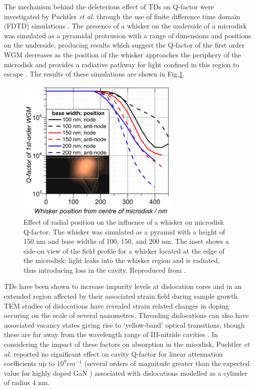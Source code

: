 The mechanism behind the deleterious effect of TDs on Q-factor were investigated by Puchtler \textit{et al.} through the use of finite difference time domain (FDTD) simulations \cite{Puchtler2015}. The presence of a whisker on the underside of a microdisk was simulated as a pyramidal protrusion with a range of dimensions and positions on the underside, producing results which suggest the Q-factor of the first order WGM decreases as the position of the whisker approaches the periphery of the microdisk and provides a radiative pathway for light confined in this region to escape \cite{Puchtler2015}. The results of these simulations are shown in Fig.\ref{puchtlersim}.
\begin{figure}[ht]
	\centering
	\includegraphics[width=0.7\textwidth]{Figs/Ch4/puchtlersim}
	\caption {Effect of radial position on the influence of a whisker on microdisk Q-factor. The whisker was simulated as a pyramid with a height of 150 nm and base widths of 100, 150, and 200 nm. The inset shows a side-on view of the field profile for a whisker located at the edge of the microdisk: light leaks into the whisker region and is radiated, thus introducing loss in the cavity. Reproduced from \cite{Puchtler2015}.}
	\label{puchtlersim}
\end{figure}
\FloatBarrier 

TDs have been shown to increase impurity levels at dislocation cores and in an extended region affected by their associated strain field during sample growth. TEM studies of dislocations have revealed strain related changes in doping occuring on the scale of several nanometres\cite{Rhode2013,Horton2015}. Threading dislocations can also have associated vacancy states giving rise to ‘yellow-band’ optical transitions, though these are far away from the wavelength range of III-nitride cavities \cite{Xin2000,Elsner1997}. In considering the impact of these factors  on absorption in the micodisk, Puchtler \textit{et al.} reported no significant effect on cavity Q-factor for linear attenuation coefficients up to $10^{9} cm^{-1}$ (several orders of magnitude greater than the expected value for highly doped GaN \cite{Ambacher1996}) associated with dislocations modelled as a cylinder of radius 4 nm.



